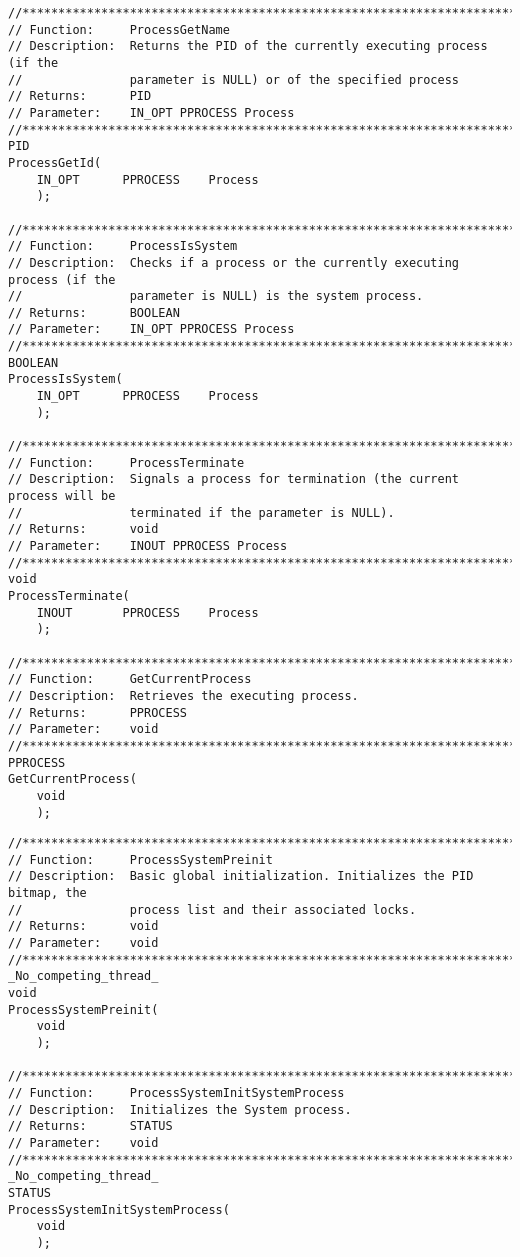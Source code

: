 \begin{appendices}
\begin{lstlisting}[caption={Process Public Interface},label={lst:ProcPublic}]
//******************************************************************************
// Function:     ProcessGetName
// Description:  Returns the PID of the currently executing process (if the
//               parameter is NULL) or of the specified process
// Returns:      PID
// Parameter:    IN_OPT PPROCESS Process
//******************************************************************************
PID
ProcessGetId(
    IN_OPT      PPROCESS    Process
    );

//******************************************************************************
// Function:     ProcessIsSystem
// Description:  Checks if a process or the currently executing process (if the
//               parameter is NULL) is the system process.
// Returns:      BOOLEAN
// Parameter:    IN_OPT PPROCESS Process
//******************************************************************************
BOOLEAN
ProcessIsSystem(
    IN_OPT      PPROCESS    Process
    );

//******************************************************************************
// Function:     ProcessTerminate
// Description:  Signals a process for termination (the current process will be
//               terminated if the parameter is NULL).
// Returns:      void
// Parameter:    INOUT PPROCESS Process
//******************************************************************************
void
ProcessTerminate(
    INOUT       PPROCESS    Process
    );

//******************************************************************************
// Function:     GetCurrentProcess
// Description:  Retrieves the executing process.
// Returns:      PPROCESS
// Parameter:    void
//******************************************************************************
PPROCESS
GetCurrentProcess(
    void
    );
\end{lstlisting}

\begin{lstlisting}[caption={Process Private Interface},label={lst:ProcPrivate}]
//******************************************************************************
// Function:     ProcessSystemPreinit
// Description:  Basic global initialization. Initializes the PID bitmap, the
//               process list and their associated locks.
// Returns:      void
// Parameter:    void
//******************************************************************************
_No_competing_thread_
void
ProcessSystemPreinit(
    void
    );

//******************************************************************************
// Function:     ProcessSystemInitSystemProcess
// Description:  Initializes the System process.
// Returns:      STATUS
// Parameter:    void
//******************************************************************************
_No_competing_thread_
STATUS
ProcessSystemInitSystemProcess(
    void
    );


\end{lstlisting}
\end{appendices}
